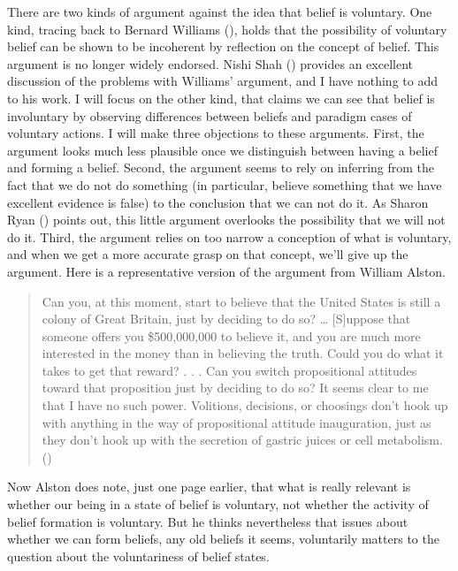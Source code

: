 \documentclass[
  10pt,
  letterpaper,
  DIV=11,
  numbers=noendperiod,
  twoside]{scrartcl}
\begin{document}
There are two kinds of argument against the idea that belief is
voluntary. One kind, tracing back to Bernard Williams
(), holds that the
possibility of voluntary belief can be shown to be incoherent by
reflection on the concept of belief. This argument is no longer widely
endorsed. Nishi Shah () provides an
excellent discussion of the problems with Williams' argument, and I have
nothing to add to his work. I will focus on the other kind, that claims
we can see that belief is involuntary by observing differences between
beliefs and paradigm cases of voluntary actions. I will make three
objections to these arguments. First, the argument looks much less
plausible once we distinguish between having a belief and forming a
belief. Second, the argument seems to rely on inferring from the fact
that we do not do something (in particular, believe something that we
have excellent evidence is false) to the conclusion that we can not do
it. As Sharon Ryan () points out, this
little argument overlooks the possibility that we will not do it. Third,
the argument relies on too narrow a conception of what is voluntary, and
when we get a more accurate grasp on that concept, we'll give up the
argument. Here is a representative version of the argument from William
Alston.

\begin{quote}
Can you, at this moment, start to believe that the United States is
still a colony of Great Britain, just by deciding to do so? \ldots{}
{[}S{]}uppose that someone offers you \$500,000,000 to believe it, and
you are much more interested in the money than in believing the truth.
Could you do what it takes to get that reward? . . . Can you switch
propositional attitudes toward that proposition just by deciding to do
so? It seems clear to me that I have no such power. Volitions,
decisions, or choosings don't hook up with anything in the way of
propositional attitude inauguration, just as they don't hook up with the
secretion of gastric juices or cell metabolism.
()
\end{quote}

Now Alston does note, just one page earlier, that what is really
relevant is whether our being in a state of belief is voluntary, not
whether the activity of belief formation is voluntary. But he thinks
nevertheless that issues about whether we can form beliefs, any old
beliefs it seems, voluntarily matters to the question about the
voluntariness of belief states.
\end{document}
